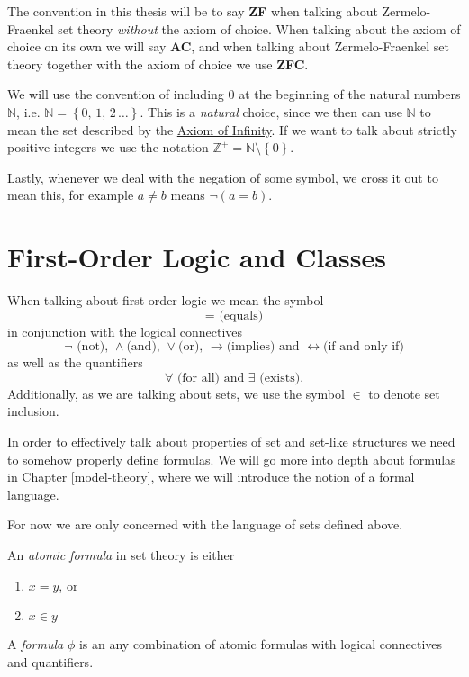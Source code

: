\documentclass[../../main.tex]{subfiles}
\begin{document}
The convention in this thesis will be to say \textbf{ZF} when talking about Zermelo-Fraenkel set theory \textit{without} the axiom of choice.
When talking about the axiom of choice on its own we will say \textbf{AC}, and when talking about Zermelo-Fraenkel set theory together with the axiom of choice we use \textbf{ZFC}.

We will use the convention of including $0$ at the beginning of the natural numbers $\mathbb{N}$, i.e. $\mathbb{N} = \left\{0, \, 1, \, 2\, \ldots\right\}$.
This is a \textit{natural} choice, since we then can use $\mathbb{N}$ to mean the set described by the \hyperref[ZF7]{Axiom of Infinity}.
If we want to talk about strictly positive integers we use the notation $\mathbb{Z}^+ = \mathbb{N}\setminus\left\{0\right\}$.

Lastly, whenever we deal with the negation of some symbol, we cross it out to mean this, for example $a \neq b$ means $\lnot \left(a = b\right)$.

\section{First-Order Logic and Classes}
When talking about first order logic we mean the symbol $$= \text{ (equals)}$$ in conjunction with the logical connectives
$$\lnot \text{ (not), } \wedge \text{(and), } \vee \text{(or), } \rightarrow \text{(implies) and } \leftrightarrow \text{(if and only if)}$$
as well as the quantifiers $$\forall \text{ (for all) and } \exists \text{ (exists)}.$$
Additionally, as we are talking about sets, we use the symbol $\in$ to denote set inclusion. \cite[pp.2-3]{Jec78}

In order to effectively talk about properties of set and set-like structures we need to somehow properly define formulas.
We will go more into depth about formulas in Chapter \ref{model-theory}, where we will introduce the notion of a formal language.

For now we are only concerned with the language of sets defined above.

\begin{definition}
    An \textit{atomic formula} in set theory is either
    \begin{enumerate}
        \item $x = y$, or
        \item $x \in y$
    \end{enumerate}
    A \textit{formula} $\phi$ is an any combination of atomic formulas with logical connectives and quantifiers.
\end{definition}
\end{document}
